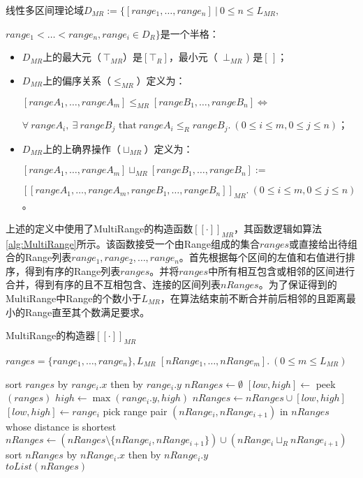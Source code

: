 \begin{definition}
	线性多区间理论域$ D_{MR}  := \{ [range_1, \dots, range_n] \ | \ 0 \le n \le L_{MR},  $
	
	$range_1 < \dots < range_n, range_i \in D_R\}$是一个半格：
	\begin{itemize}
		\item $ D_{MR} $上的最大元（$\, \top_{MR} $）是$ [\top_R] $，最小元（\, $ \bot_{MR} $ ) 是$ [\,] $；
		
		\item $ D_{MR} $上的偏序关系（$ \le_{MR} $）定义为：\\
			\centerline{$[rangeA_1, \dots, rangeA_m] \le_{MR} [rangeB_1, \dots, rangeB_n] \iff$}
			\centerline{$ \forall \ rangeA_i, \ \exists\  rangeB_j \text{ that} \ rangeA_i \le_R rangeB_j .\  (0 \le i \le m, 0 \le j \le n)$；}
			
		\item $ D_{MR} $上的上确界操作（$ \sqcup_{MR} $）定义为：\\
			\centerline{$ [rangeA_1, \dots, rangeA_m] \sqcup_{MR} [rangeB_1, \dots, rangeB_n]  := $}
			\centerline{$ [[rangeA_1, \dots, rangeA_m, rangeB_1, \dots, rangeB_n]]_{MR} .\  (0 \le i \le m, 0 \le j \le n)$。}
	\end{itemize}
	
\end{definition}

上述的定义中使用了MultiRange的构造函数$ [[\cdot]]_{MR} $，其函数逻辑如算法\ref{alg:MultiRange}所示。该函数接受一个由Range组成的集合$ ranges $或直接给出待组合的Range列表$ range_1, range_2, \dots, range_n $。首先根据每个区间的左值和右值进行排序，得到有序的Range列表$ ranges $。并将$ ranges $中所有相互包含或相邻的区间进行合并，得到有序的且不互相包含、连接的区间列表$ nRanges $。为了保证得到的MultiRange中Range的个数小于$ L_{MR} $，在算法结束前不断合并前后相邻的且距离最小的Range直至其个数满足要求。

\begin{algorithm}[H]
	\caption{MultiRange的构造器$ [[\cdot]]_{MR} $}
	\label{alg:MultiRange}
	\begin{algorithmic}[1]
		
		\Require $ ranges = \{range_1, \dots, range_n\}, L_{MR} $
		\Ensure $ [nRange_1, \dots, nRange_m]. \ (0 \le m \le L_{MR})$
		
		\State sort $ ranges $ by $ range_{i}.x $ then by $ range_{i}.y $
		\State $ nRanges \gets \emptyset$
		\State $ [low, high] \gets$ peek$ (ranges) $
				\State $ high \gets \max(range_i.y, high) $
			\Else
				\State $ nRanges \gets nRanges \cup [low, high] $
				\State $ [low, high] \gets range_i $
			\EndIf
		\EndFor
			\State pick range pair $ (nRange_i, nRange_{i+1} )$ in $ nRanges $ whose distance is shortest
			\State $ nRanges \gets (nRanges \setminus\{nRange_i, nRange_{i+1}\}) \cup (nRange_i \sqcup_R nRange_{i+1}) $
			\State sort $ nRanges $ by $ nRange_{i}.x $ then by $ nRange_{i}.y $
		\EndWhile
		\\\Return $ toList(nRanges) $
		
	\end{algorithmic}
\end{algorithm}

